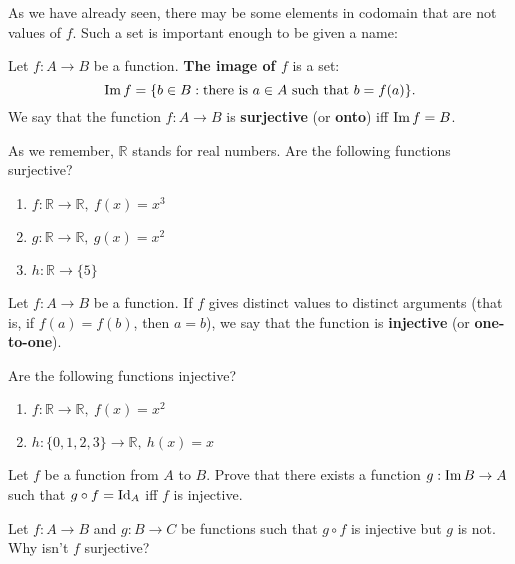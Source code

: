 \noindent As we have already seen, there may be some elements in codomain that are not values of $f$. Such a set is important enough to be given a name:

\begin{definition}
  Let $f:A\to B$ be a function. \textbf{The image of $f$} is a set:
  $$\text{Im}\, f=\{b\in B : \text{there is } a\in A \text{ such that } b=f(a)\}.$$
  We say that the function $f: A\to B$ is \textbf{surjective} (or \textbf{onto}) iff $\text{Im}\, f=B$.
\end{definition}

\begin{prob}
	As we remember, $\mathbb{R}$ stands for real numbers. Are the following functions surjective?
	\begin{enumerate}
		\item $f: \mathbb{R} \to \mathbb{R}, ~f(x)=x^3$
		\item $g: \mathbb{R} \to \mathbb{R}, ~g(x)=x^2$
		\item $h: \mathbb{R} \to \{5\}$
	\end{enumerate}
\end{prob}

\begin{definition}
  Let $f:A\to B$ be a function. If $f$ gives distinct values to distinct arguments (that is, if $f(a)=f(b)$, then $a=b$), we say that the function is \textbf{injective}
  (or \textbf{one-to-one}).
\end{definition}

\begin{exercise}
  Are the following functions injective?
	\begin{enumerate}
		\item $f: \mathbb{R} \to \mathbb R, ~f(x)=x^2$
		\item $h: \{0,1,2,3\} \to \mathbb R, ~h(x)=x$
	\end{enumerate}
\end{exercise}

\begin{exercise}
	Let $f$ be a function from $A$ to $B$. Prove that there exists a function $g: \text{Im}\, B\to A$ such that $g\circ f=\text{Id}_A$ iff $f$ is injective.
\end{exercise}

\begin{exercise}
	Let $f: A\to B$ and $g: B\to C$ be functions such that $g\circ f$ is injective but $g$ is not. Why isn't $f$ surjective?
\end{exercise}

